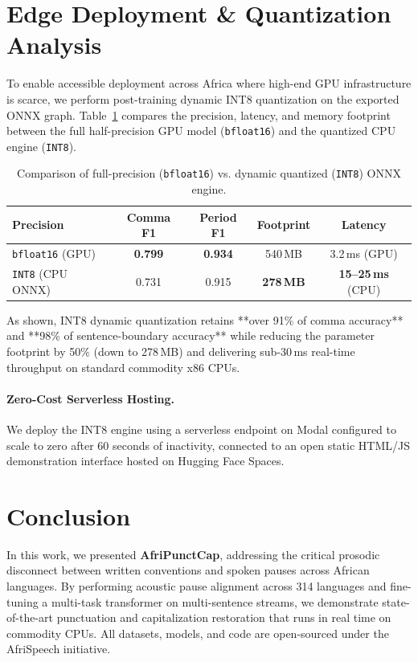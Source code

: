 \documentclass[11pt,a4paper]{article}
\begin{document}
\section{Edge Deployment \& Quantization Analysis}
To enable accessible deployment across Africa where high-end GPU infrastructure is scarce, we perform post-training dynamic INT8 quantization on the exported ONNX graph. Table~\ref{tab:quantization} compares the precision, latency, and memory footprint between the full half-precision GPU model (\texttt{bfloat16}) and the quantized CPU engine (\texttt{INT8}).

\begin{table}[h]
\centering
\small
\begin{tabular}{lcccc}
\toprule
\textbf{Precision} & \textbf{Comma F1} & \textbf{Period F1} & \textbf{Footprint} & \textbf{Latency} \\
\midrule
\texttt{bfloat16} (GPU) & \textbf{0.799} & \textbf{0.934} & 540\,MB & 3.2\,ms (GPU) \\
\texttt{INT8} (CPU ONNX) & 0.731 & 0.915 & \textbf{278\,MB} & \textbf{15--25\,ms} (CPU) \\
\bottomrule
\end{tabular}
\caption{Comparison of full-precision (\texttt{bfloat16}) vs. dynamic quantized (\texttt{INT8}) ONNX engine.}
\label{tab:quantization}
\end{table}

As shown, INT8 dynamic quantization retains **over 91\% of comma accuracy** and **98\% of sentence-boundary accuracy** while reducing the parameter footprint by 50\% (down to 278\,MB) and delivering sub-30\,ms real-time throughput on standard commodity x86 CPUs.

\paragraph{Zero-Cost Serverless Hosting.} We deploy the INT8 engine using a serverless endpoint on Modal configured to scale to zero after 60 seconds of inactivity, connected to an open static HTML/JS demonstration interface hosted on Hugging Face Spaces.

\section{Conclusion}
In this work, we presented \textbf{AfriPunctCap}, addressing the critical prosodic disconnect between written conventions and spoken pauses across African languages. By performing acoustic pause alignment across 314 languages and fine-tuning a multi-task transformer on multi-sentence streams, we demonstrate state-of-the-art punctuation and capitalization restoration that runs in real time on commodity CPUs. All datasets, models, and code are open-sourced under the AfriSpeech initiative.



\end{document}
